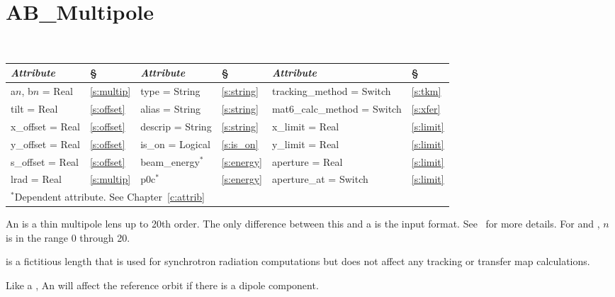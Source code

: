 \vfil
\break

\section{AB\_Multipole}
\label{s:ab_m}

\begin{center}
\tt 
\begin{tabular}{|l|l||l|l||l|l|} \hline
  {\sl Attribute} & \S  & {\sl Attribute} & \S & {\sl Attribute} & \S \\ \hline
  a$n$, b$n$ = Real  &  \ref{s:multip} &  type = String    & \ref{s:string} & tracking\_method = Switch    & \ref{s:tkm}   \\ \hline
  tilt       = Real  &  \ref{s:offset} &  alias = String   & \ref{s:string} & mat6\_calc\_method = Switch  & \ref{s:xfer}  \\ \hline
  x\_offset  = Real  &  \ref{s:offset} &  descrip = String & \ref{s:string} & x\_limit = Real              & \ref{s:limit} \\ \hline
  y\_offset  = Real  &  \ref{s:offset} &  is\_on = Logical & \ref{s:is_on}  & y\_limit = Real              & \ref{s:limit} \\ \hline
  s\_offset  = Real  &  \ref{s:offset} &  beam\_energy$^*$ & \ref{s:energy} & aperture = Real              & \ref{s:limit} \\ \hline
  lrad       = Real  &  \ref{s:multip} &  p0c$^*$          & \ref{s:energy} & aperture\_at = Switch        & \ref{s:limit} \\ \hline
  \multicolumn{6}{l}{\small $^*$Dependent attribute. See Chapter~\ref{c:attrib}} \\
\end{tabular}
\end{center}
\toffset

An  is a thin multipole lens up to 20th order. The only
difference between this and a  is the input format. See~ for more details. For 
and , $n$ is in the range 0 through 20.

 is a fictitious length that is used for synchrotron radiation
computations but does not affect any tracking or transfer map calculations. 

Like a \mad {}, An  will affect the
reference orbit if there is a dipole component. 

